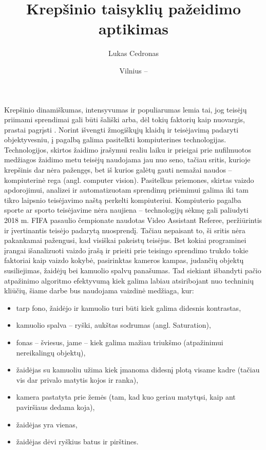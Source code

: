 \documentclass{VUMIFPSkursinis}
\title{Krepšinio taisyklių pažeidimo aptikimas}
\author{Lukas Cedronas}
\date{Vilnius – \the\year}
\begin{document}
\maketitle

\tableofcontents

Krepšinio dinamiškumas, intensyvumas ir populiarumas lemia tai, jog teisėjų priimami sprendimai gali būti šališki \cite{ProfitableBias} arba, dėl tokių faktorių kaip nuovargis, prastai pagrįsti \cite{MissedCalls}. Norint išvengti žmogiškųjų klaidų ir teisėjavimą padaryti objektyvesniu, į pagalbą galima pasitelkti kompiuterines technologijas. Technologijos, skirtos žaidimo įrašymui realiu laiku ir prieigai prie nufilmuotos medžiagos žaidimo metu teisėjų naudojama jau nuo seno, tačiau sritis, kurioje krepšinis dar nėra pažengęs, bet iš kurios galėtų gauti nemažai naudos – kompiuterinė rega (angl. computer vision). Pasitelkus priemones, skirtas vaizdo apdorojimui, analizei ir automatizuotam sprendimų priėmimui galima iki tam tikro laipsnio teisėjavimo naštą perkelti kompiuteriui. Kompiuterio pagalba sporte ar sporto teisėjavime nėra naujiena – technologijų sėkmę gali paliudyti  2018 m. FIFA pasaulio čempionate naudotas Video Assistant Referee, peržiūrintis ir įvertinantis teisėjo padarytą nuosprendį. Tačiau nepaisant to, ši sritis nėra pakankamai pažengusi, kad visiškai pakeistų teisėjus. Bet kokiai programinei įrangai išanalizuoti vaizdo įrašą ir prieiti prie teisingo sprendimo trukdo tokie faktoriai kaip vaizdo kokybė, pasirinktas kameros kampas, judančių objektų susiliejimas, žaidėjų bei kamuolio spalvų panašumas. Tad siekiant išbandyti pačio atpažinimo algoritmo efektyvumą kiek galima labiau atsiribojant nuo techninių kliūčių, šiame darbe bus naudojama vaizdinė medžiaga, kur:
\begin{itemize}
 \item tarp fono, žaidėjo ir kamuolio turi būti kiek galima didesnis kontrastas,
 \item kamuolio spalva – ryški, aukštas sodrumas (angl. Saturation),
 \item fonas – šviesus, jame – kiek galima mažiau triukšmo (atpažinimui nereikalingų objektų),
 \item žaidėjas su kamuoliu užima kiek įmanoma didesnį plotą visame kadre (tačiau vis dar privalo matytis kojos ir ranka),
 \item kamera pastatyta prie žemės (tam, kad kuo geriau matytųsi, kaip ant paviršiaus dedama koja),
 \item žaidėjas yra vienas,
 \item žaidėjas dėvi ryškius batus ir pirštines.
\end{itemize}
\end{document}
